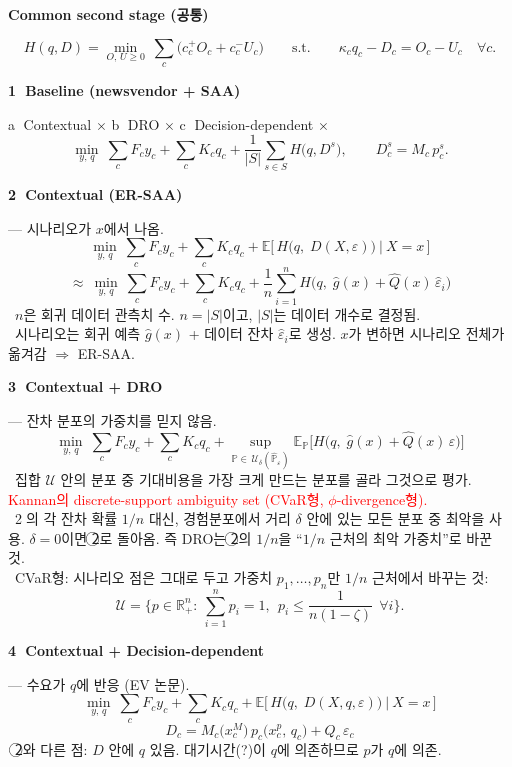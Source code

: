 \documentclass[10pt,a4paper]{article}
\newcommand{\hd}[1]{\par\vspace{8pt}\textbf{#1}\par\vspace{3pt}}
\newcommand{\circnum}[1]{\textcircled{\scriptsize #1}}
\newcommand{\note}{\textreferencemark\ }
\newcommand{\red}[1]{\textcolor{red}{#1}}
\begin{document}
\hd{Common second stage (공통)}
\[
H(q,D)=\min_{O,\,U\ge 0}\ \sum_{c}\big(c_c^{+}O_c+c_c^{-}U_c\big)
\qquad\text{s.t.}\qquad
\kappa_c q_c-D_c=O_c-U_c\quad\forall c.
\]

\hd{\circnum{1} Baseline (newsvendor + SAA)}
\quad \circnum{a} Contextual $\times$ \quad \circnum{b} DRO $\times$ \quad \circnum{c} Decision-dependent $\times$
\[
\min_{y,\,q}\ \sum_{c}F_c y_c+\sum_{c}K_c q_c+\frac{1}{|S|}\sum_{s\in S}H\big(q,D^{s}\big),
\qquad D^{s}_c=M_c\,p^{s}_c .
\]

\hd{\circnum{2} Contextual (ER-SAA)} --- 시나리오가 $x$에서 나옴.
\[
\min_{y,\,q}\ \sum_{c}F_c y_c+\sum_{c}K_c q_c
+\mathbb{E}\big[\,H\big(q,\;D(X,\varepsilon)\big)\ \big|\ X=x\,\big]
\]
\[
\approx\ \min_{y,\,q}\ \sum_{c}F_c y_c+\sum_{c}K_c q_c
+\frac{1}{n}\sum_{i=1}^{n}H\Big(q,\;\hat g(x)+\hat Q(x)\,\hat\varepsilon_i\Big)
\]
\note $n$은 회귀 데이터 관측치 수. $n=|S|$이고, $|S|$는 데이터 개수로 결정됨.\\
\note 시나리오는 회귀 예측 $\hat g(x)$ + 데이터 잔차 $\hat\varepsilon_i$로 생성. $x$가 변하면 시나리오 전체가 옮겨감 $\Rightarrow$ ER-SAA.

\hd{\circnum{3} Contextual + DRO} --- 잔차 분포의 가중치를 믿지 않음.
\[
\min_{y,\,q}\ \sum_{c}F_c y_c+\sum_{c}K_c q_c
+\sup_{\mathbb{P}\in\,\mathcal{U}_\delta(\hat{\mathbb{P}}_\varepsilon)}
\mathbb{E}_{\mathbb{P}}\Big[H\Big(q,\;\hat g(x)+\hat Q(x)\,\varepsilon\Big)\Big]
\]
\note 집합 $\mathcal U$ 안의 분포 중 기대비용을 가장 크게 만드는 분포를 골라 그것으로 평가.
\red{Kannan의 discrete-support ambiguity set (CVaR형, $\phi$-divergence형).}\\
\note \circnum{2}의 각 잔차 확률 $1/n$ 대신, 경험분포에서 거리 $\delta$ 안에 있는 모든 분포 중 최악을 사용.
$\delta=0$이면 \circnum{2}로 돌아옴.
즉 DRO는 \circnum{2}의 $1/n$을 ``$1/n$ 근처의 최악 가중치''로 바꾼 것.\\
\note CVaR형: 시나리오 점은 그대로 두고 가중치 $p_1,\dots,p_n$만 $1/n$ 근처에서 바꾸는 것:
\[
\mathcal{U}=\Big\{p\in\mathbb{R}^n_{+}:\ \sum_{i=1}^{n}p_i=1,\ \ p_i\le\frac{1}{n(1-\zeta)}\ \ \forall i\Big\}.
\]

\hd{\circnum{4} Contextual + Decision-dependent} --- 수요가 $q$에 반응 (EV 논문).
\[
\min_{y,\,q}\ \sum_{c}F_c y_c+\sum_{c}K_c q_c
+\mathbb{E}\big[\,H\big(q,\;D(X,q,\varepsilon)\big)\ \big|\ X=x\,\big]
\]
\[
D_c=M_c\big(x_c^{M}\big)\,p_c\big(x_c^{p},\,q_c\big)+Q_c\,\varepsilon_c
\]
\note \circnum{2}와 다른 점: $D$ 안에 $q$ 있음. 대기시간(?)이 $q$에 의존하므로 $p$가 $q$에 의존.
\end{document}

